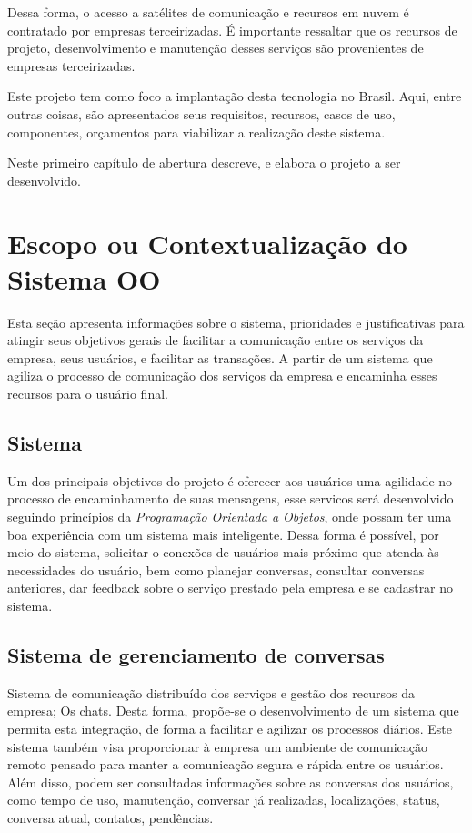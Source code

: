 Dessa forma, o acesso a satélites de comunicação e recursos em nuvem é contratado por empresas terceirizadas.
É importante ressaltar que os recursos de projeto, desenvolvimento e manutenção desses serviços são provenientes de empresas terceirizadas.

Este projeto tem como foco a implantação desta tecnologia no Brasil. Aqui, entre outras coisas, são apresentados seus requisitos, recursos, casos de uso, componentes, orçamentos para viabilizar a realização deste sistema.



Neste primeiro capítulo de abertura descreve, e elabora o projeto a ser desenvolvido.



\section{Escopo ou Contextualiza\c{c}\~{a}o do Sistema OO}
Esta seção apresenta informações sobre o sistema, prioridades e justificativas para atingir seus objetivos gerais de facilitar a comunicação entre os serviços da empresa, seus usuários, e facilitar as transações. A partir de um sistema que agiliza o processo de comunicação dos serviços da empresa e encaminha esses recursos para o usuário final.
\subsection{Sistema}
Um dos principais objetivos do projeto é oferecer aos usuários uma agilidade no processo de encaminhamento de suas mensagens, esse servicos será desenvolvido seguindo princípios da \textit{Programação Orientada a Objetos}, onde possam ter uma boa experiência com um sistema mais inteligente.
Dessa forma é possível, por meio do sistema, solicitar o conexões de usuários mais próximo que atenda às necessidades do usuário, bem como planejar conversas, consultar conversas anteriores, dar feedback sobre o serviço prestado pela empresa e se cadastrar no sistema.


\subsection{Sistema de gerenciamento de conversas}
Sistema de comunicação distribuído dos serviços e gestão dos recursos da empresa; Os chats. Desta forma, propõe-se o desenvolvimento de um sistema que permita esta integração, de forma a facilitar e agilizar os processos diários. Este sistema também visa proporcionar à empresa um ambiente de comunicação remoto pensado para manter a comunicação segura e rápida entre os usuários. Além disso, podem ser consultadas informações sobre as conversas dos usuários, como tempo de uso, manutenção, conversar já realizadas, localizações, status, conversa atual, contatos, pendências.


